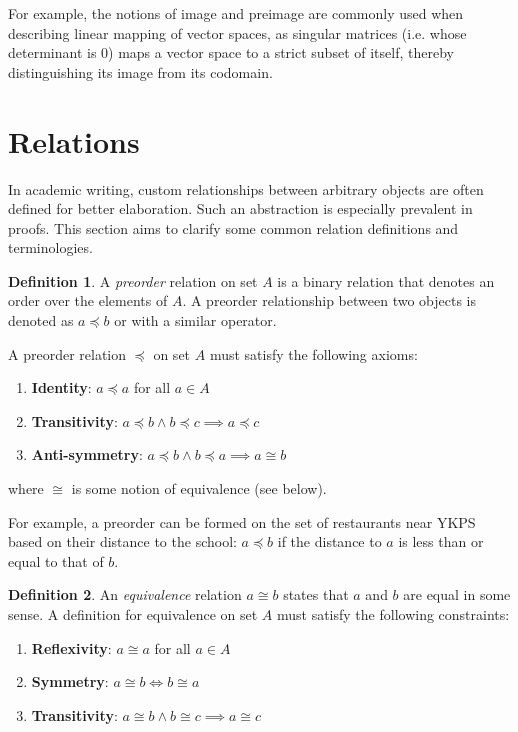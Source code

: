 \documentclass[12pt]{article}
\theoremstyle{definition}
\newtheorem{defn}{Definition}[section]
\begin{document}
 	For example, the notions of image and preimage are commonly used when describing linear mapping of vector spaces, as singular matrices (i.e. whose determinant is $0$) maps a vector space to a strict subset of itself, thereby distinguishing its image from its codomain.
	
	\section{Relations}
	
	In academic writing, custom relationships between arbitrary objects are often defined for better elaboration. Such an abstraction is especially prevalent in proofs. This section aims to clarify some common relation definitions and terminologies.
	
	\begin{defn}
		A \emph{preorder} relation on set $A$ is a binary relation that denotes an order over the elements of $A$. A preorder relationship between two objects is denoted as $a \preceq b$ or with a similar operator.
		
		A preorder relation $\preceq$ on set $A$ must satisfy the following axioms:
		\begin{enumerate}
			\item \textbf{Identity}: $a \preceq a$ for all $a \in A$
			\item \textbf{Transitivity}: $a \preceq b \land b \preceq c \implies a \preceq c$
			\item \textbf{Anti-symmetry}: $a \preceq b \land b \preceq a \implies a \cong b$
		\end{enumerate}
		where $\cong$ is some notion of equivalence (see below).
 	\end{defn}
 	
 	For example, a preorder can be formed on the set of restaurants near YKPS based on their distance to the school: $a \preceq b$ if the distance to $a$ is less than or equal to that of $b$.
 	
 	\begin{defn}
 		An \emph{equivalence} relation $a \cong b$ states that $a$ and $b$ are equal in some sense. A definition for equivalence on set $A$ must satisfy the following constraints:
 		\begin{enumerate}
 			\item \textbf{Reflexivity}: $a \cong a$ for all $a \in A$
 			\item \textbf{Symmetry}: $a \cong b \iff b \cong a$
 			\item \textbf{Transitivity}: $a \cong b \land b \cong c \implies a \cong c$
 		\end{enumerate}
 	\end{defn}
 	
\end{document}
